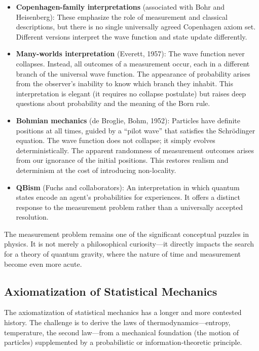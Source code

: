 \begin{itemize}
    \item \textbf{Copenhagen-family interpretations} (associated with Bohr and Heisenberg): These emphasize the role of measurement and classical descriptions, but there is no single universally agreed Copenhagen axiom set. Different versions interpret the wave function and state update differently.

    \item \textbf{Many-worlds interpretation} (Everett, 1957): The wave function never collapses. Instead, all outcomes of a measurement occur, each in a different branch of the universal wave function. The appearance of probability arises from the observer's inability to know which branch they inhabit. This interpretation is elegant (it requires no collapse postulate) but raises deep questions about probability and the meaning of the Born rule.

    \item \textbf{Bohmian mechanics} (de Broglie, Bohm, 1952): Particles have definite positions at all times, guided by a ``pilot wave'' that satisfies the Schr\"odinger equation. The wave function does not collapse; it simply evolves deterministically. The apparent randomness of measurement outcomes arises from our ignorance of the initial positions. This restores realism and determinism at the cost of introducing non-locality.

    \item \textbf{QBism} (Fuchs and collaborators): An interpretation in which quantum states encode an agent's probabilities for experiences. It offers a distinct response to the measurement problem rather than a universally accepted resolution.
\end{itemize}

The measurement problem remains one of the significant conceptual puzzles in physics. It is not merely a philosophical curiosity---it directly impacts the search for a theory of quantum gravity, where the nature of time and measurement become even more acute.

\subsection{Axiomatization of Statistical Mechanics}

The axiomatization of statistical mechanics has a longer and more contested history. The challenge is to derive the laws of thermodynamics---entropy, temperature, the second law---from a mechanical foundation (the motion of particles) supplemented by a probabilistic or information-theoretic principle.

